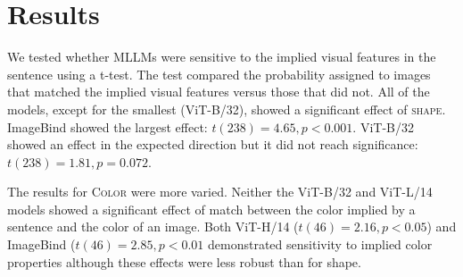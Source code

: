 \documentclass[10pt, a4paper]{article}
\begin{document}

\section{Results}

We tested whether MLLMs were sensitive to the implied visual features in the sentence using a t-test.
The test compared the probability assigned to images that matched the implied visual features versus those that did not.
All of the models, except for the smallest (ViT-B/32), showed a significant effect of \textsc{shape}.
ImageBind showed the largest effect: $t(238) = 4.65, p < 0.001$.
ViT-B/32 showed an effect in the expected direction but it did not reach significance: $t(238) = 1.81, p = 0.072$.

The results for \textsc{Color} were more varied. Neither the ViT-B/32 and ViT-L/14 models showed a significant effect of match between the color implied by a sentence and the color of an image.
Both ViT-H/14 ($t(46) = 2.16, p < 0.05$) and ImageBind ($t(46) = 2.85, p < 0.01$ demonstrated sensitivity to implied color properties although these effects were less robust than for shape.
\end{document}
